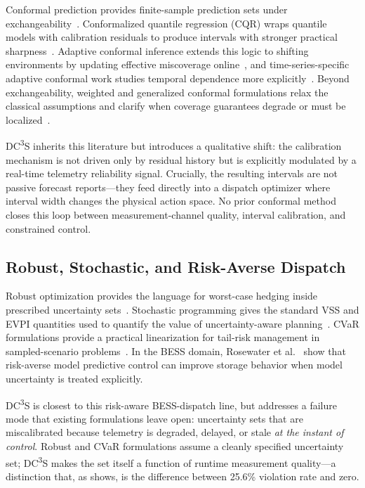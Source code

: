 \documentclass[11pt,a4paper]{article}
\begin{document}
Conformal prediction provides finite-sample prediction sets under exchangeability~\cite{vovk2005conformal,shafer2008tutorial}. Conformalized quantile regression (CQR) wraps quantile models with calibration residuals to produce intervals with stronger practical sharpness~\cite{romano2019conformalized}. Adaptive conformal inference extends this logic to shifting environments by updating effective miscoverage online~\cite{gibbs2021adaptive}, and time-series-specific adaptive conformal work studies temporal dependence more explicitly~\cite{zaffran2022adaptive}. Beyond exchangeability, weighted and generalized conformal formulations relax the classical assumptions and clarify when coverage guarantees degrade or must be localized~\cite{barber2023conformal}.

DC\textsuperscript{3}S inherits this literature but introduces a qualitative shift: the calibration mechanism is not driven only by residual history but is explicitly modulated by a real-time telemetry reliability signal. Crucially, the resulting intervals are not passive forecast reports---they feed directly into a dispatch optimizer where interval width changes the physical action space. No prior conformal method closes this loop between measurement-channel quality, interval calibration, and constrained control.

\subsection{Robust, Stochastic, and Risk-Averse Dispatch}

Robust optimization provides the language for worst-case hedging inside prescribed uncertainty sets~\cite{bertsimas2011theory,ben2009robust}. Stochastic programming gives the standard VSS and EVPI quantities used to quantify the value of uncertainty-aware planning~\cite{birge2011stochastic}. CVaR formulations provide a practical linearization for tail-risk management in sampled-scenario problems~\cite{rockafellar2000optimization}. In the BESS domain, Rosewater et al.~\cite{rosewater2020riskaverse} show that risk-averse model predictive control can improve storage behavior when model uncertainty is treated explicitly.

DC\textsuperscript{3}S is closest to this risk-aware BESS-dispatch line, but addresses a failure mode that existing formulations leave open: uncertainty sets that are miscalibrated because telemetry is degraded, delayed, or stale \emph{at the instant of control}. Robust and CVaR formulations assume a cleanly specified uncertainty set; DC\textsuperscript{3}S makes the set itself a function of runtime measurement quality---a distinction that, as  shows, is the difference between 25.6\% violation rate and zero.
\end{document}
